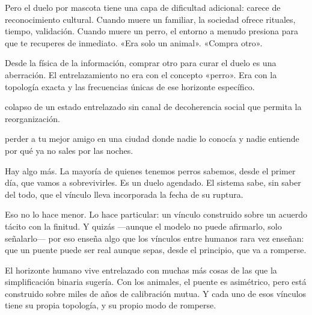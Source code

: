 Pero el duelo por mascota tiene una capa de dificultad adicional: carece de reconocimiento cultural. Cuando muere un familiar, la sociedad ofrece rituales, tiempo, validación. Cuando muere un perro, el entorno a menudo presiona para que te recuperes de inmediato. «Era solo un animal». «Compra otro».

Desde la física de la información, comprar otro para curar el duelo es una aberración. El entrelazamiento no era con el concepto «perro». Era con la topología exacta y las frecuencias únicas de ese horizonte específico.

\begin{fisica}
 colapso de un estado entrelazado sin canal de decoherencia social que permita la reorganización.

 perder a tu mejor amigo en una ciudad donde nadie lo conocía y nadie entiende por qué ya no sales por las noches.
\end{fisica}
Hay algo más. La mayoría de quienes tenemos perros sabemos, desde el primer día, que vamos a sobrevivirles. Es un duelo agendado. El sistema sabe, sin saber del todo, que el vínculo lleva incorporada la fecha de su ruptura.

Eso no lo hace menor. Lo hace particular: un vínculo construido sobre un acuerdo tácito con la finitud. Y quizás —aunque el modelo no puede afirmarlo, solo señalarlo— por eso enseña algo que los vínculos entre humanos rara vez enseñan: que un puente puede ser real aunque sepas, desde el principio, que va a romperse.

El horizonte humano vive entrelazado con muchas más cosas de las que la simplificación binaria sugería. Con los animales, el puente es asimétrico, pero está construido sobre miles de años de calibración mutua. Y cada uno de esos vínculos tiene su propia topología, y su propio modo de romperse.

